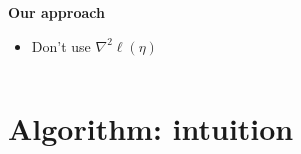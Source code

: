 \documentclass[ 10pt]{beamer}
\newcommand{\etaMLE}{\hat{\eta}_{\textrm{MLE}}}
\begin{document}
{\begin{columns}[]
\begin{column}[t]{0.4\textwidth}
{\begin{block}{
\textbf{Our approach}}
\begin{itemize}
\item Don't use $\nabla^2 \ell( \eta)$
\end{itemize}
\end{block}
}
\end{column}
\end{columns}

}
\section{Algorithm: intuition}
%
%
%
%
\end{document}
